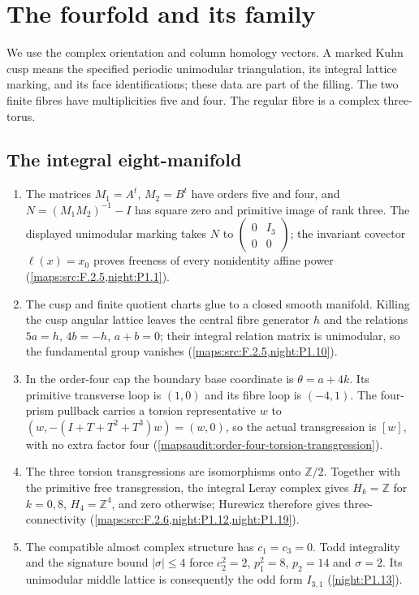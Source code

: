 \section{The fourfold and its family}
\label{sec:V-results}

We use the complex orientation and column homology vectors.  A marked
Kuhn cusp means the specified periodic unimodular triangulation, its
integral lattice marking, and its face identifications; these data are
part of the filling.  The two finite fibres have multiplicities five
and four.  The regular fibre is a complex three-torus.

\subsection{The integral eight-manifold}
\RungOne
\begin{enumerate}[label=\arabic*.]
\item The matrices $M_1=A^t$, $M_2=B^t$ have orders five and four, and
  $N=(M_1M_2)^{-1}-I$ has square zero and primitive image of rank three.
  The displayed unimodular marking takes $N$ to
  $\left(\begin{smallmatrix}0&I_3\\0&0\end{smallmatrix}\right)$;
  the invariant covector $\ell(x)=x_0$ proves freeness of every
  nonidentity affine power
  (\cref{maps:src:F.2.5,night:P1.1}).
\item The cusp and finite quotient charts glue to a closed smooth
  manifold.  Killing the cusp angular lattice leaves the central fibre
  generator $h$ and the relations $5a=h$, $4b=-h$, $a+b=0$;
  their integral relation matrix is unimodular, so the fundamental
  group vanishes (\cref{maps:src:F.2.5,night:P1.10}).
\item In the order-four cap the boundary base coordinate is
  $\theta=a+4k$.  Its primitive transverse loop is $(1,0)$ and its
  fibre loop is $(-4,1)$.  The four-prism pullback carries a torsion
  representative $w$ to $(w,-(I+T+T^2+T^3)w)=(w,0)$, so the actual
  transgression is $[w]$, with no extra factor four
  (\cref{mapsaudit:order-four-torsion-transgression}).
\item The three torsion transgressions are isomorphisms onto
  $\mathbb Z/2$.  Together with the primitive free transgression,
  the integral Leray complex gives
  $H_k=\mathbb Z$ for $k=0,8$, $H_4=\mathbb Z^4$, and zero otherwise;
  Hurewicz therefore gives three-connectivity
  (\cref{maps:src:F.2.6,night:P1.12,night:P1.19}).
\item The compatible almost complex structure has $c_1=c_3=0$.
  Todd integrality and the signature bound $|\sigma|\leq4$ force
  $c_2^2=2$, $p_1^2=8$, $p_2=14$ and $\sigma=2$.
  Its unimodular middle lattice is consequently the odd form
  $I_{3,1}$ (\cref{night:P1.13}).
\end{enumerate}

